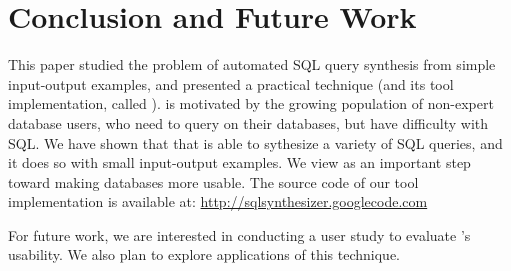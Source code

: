 \section{Conclusion and Future Work}
\label{sec:conclusion}




This paper studied the problem of automated SQL query synthesis
from simple input-output examples, and presented a
practical technique (and its tool implementation, called \ourtool).
\ourtool is motivated by the growing population of
non-expert database users, who need to query on their
databases, but have difficulty with SQL.
We have shown that that \ourtool is
able to sythesize a variety of SQL queries,
and it does so with small input-output examples. We view
\ourtool as an important step toward making databases
more usable.
The source code of our tool implementation is available at: 
\url{http://sqlsynthesizer.googlecode.com}


For future work, we are interested in conducting a user study
to evaluate \ourtool's usability. We also plan to explore
applications of this technique.

\vspace{1mm}

\begin{comment}
Our future work will concentrate on the following topics:

\textbf{Enrich the supported SQL subset.} We plan to enrich the
supported SQL subset by \ourtool, and design a corresponding algorithm
to synthesize more general queries.

\textbf{Illustration of synthesis steps.} Besides
producing a final result, end-users may also be interested in knowing
how a SQL query is inferred step by step.
Showing detailed inference steps not
only makes \ourtool more usable, but also permits
end-users to better understand the whole process and
spot possible errors earlier.
We plan to apply recent advance in data visualization~\cite{Kandel:2011}
to the context of program synthesis.

\textbf{Noise detection and tolerance in users' inputs.} The current technique
requires users to provide noise-free input-output examples.
Even in the presence of a small amount of user-input noises (e.g., a typo),
the inference algorithm will declare failure when it fails to learn
a valid SQL query.
To overcome this limitation, we plan to design a more robust inference
algorithm that can attempt to identify and tolerate user-input noises,
and even suggest a fix to the noisy example.

\end{comment}


